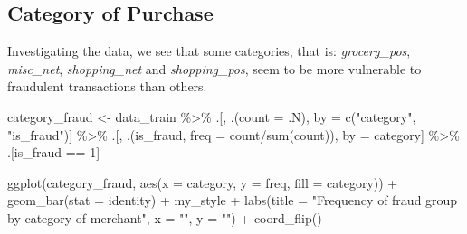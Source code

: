 \documentclass[
]{report}
\newenvironment{Shaded}{\begin{snugshade}}{\end{snugshade}}
\newcommand{\AttributeTok}[1]{\textcolor[rgb]{0.77,0.63,0.00}{#1}}
\newcommand{\DecValTok}[1]{\textcolor[rgb]{0.00,0.00,0.81}{#1}}
\newcommand{\FunctionTok}[1]{\textcolor[rgb]{0.00,0.00,0.00}{#1}}
\newcommand{\NormalTok}[1]{#1}
\newcommand{\OtherTok}[1]{\textcolor[rgb]{0.56,0.35,0.01}{#1}}
\newcommand{\SpecialCharTok}[1]{\textcolor[rgb]{0.00,0.00,0.00}{#1}}
\newcommand{\StringTok}[1]{\textcolor[rgb]{0.31,0.60,0.02}{#1}}
\begin{document}
\hypertarget{category-of-purchase}{%
\subsection{Category of Purchase}\label{category-of-purchase}}

Investigating the data, we see that some categories, that is:
\emph{grocery\_pos}, \emph{misc\_net}, \emph{shopping\_net} and
\emph{shopping\_pos}, seem to be more vulnerable to fraudulent
transactions than others.

\begin{Shaded}
\begin{Highlighting}[]
\NormalTok{category\_fraud }\OtherTok{\textless{}{-}}\NormalTok{ data\_train }\SpecialCharTok{\%\textgreater{}\%} 
\NormalTok{  .[, .(}\AttributeTok{count =}\NormalTok{ .N), by }\OtherTok{=} \FunctionTok{c}\NormalTok{(}\StringTok{"category"}\NormalTok{, }\StringTok{"is\_fraud"}\NormalTok{)] }\SpecialCharTok{\%\textgreater{}\%}
\NormalTok{  .[, .(is\_fraud, }\AttributeTok{freq =}\NormalTok{ count}\SpecialCharTok{/}\FunctionTok{sum}\NormalTok{(count)), by }\OtherTok{=}\NormalTok{ category] }\SpecialCharTok{\%\textgreater{}\%}
\NormalTok{  .[is\_fraud }\SpecialCharTok{==} \DecValTok{1}\NormalTok{]}
\end{Highlighting}
\end{Shaded}

\begin{Shaded}
\begin{Highlighting}[]
\FunctionTok{ggplot}\NormalTok{(category\_fraud, }\FunctionTok{aes}\NormalTok{(}\AttributeTok{x =}\NormalTok{ category, }\AttributeTok{y =}\NormalTok{ freq, }\AttributeTok{fill =}\NormalTok{ category)) }\SpecialCharTok{+}
  \FunctionTok{geom\_bar}\NormalTok{(}\AttributeTok{stat =} \StringTok{\textquotesingle{}identity\textquotesingle{}}\NormalTok{) }\SpecialCharTok{+}
\NormalTok{  my\_style }\SpecialCharTok{+}
  \FunctionTok{labs}\NormalTok{(}\AttributeTok{title =} \StringTok{"Frequency of fraud group by category of merchant"}\NormalTok{,}
       \AttributeTok{x =} \StringTok{""}\NormalTok{,}
       \AttributeTok{y =} \StringTok{""}\NormalTok{) }\SpecialCharTok{+}
  \FunctionTok{coord\_flip}\NormalTok{()}
\end{Highlighting}
\end{Shaded}
\end{document}
